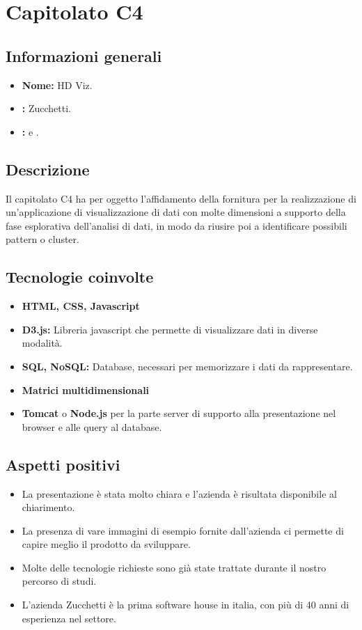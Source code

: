 \section{Capitolato C4}

\subsection{Informazioni generali}
\begin{itemize}
\item \textbf{Nome:} HD Viz.
\item \textbf{\commitProg:} Zucchetti.
\item \textbf{\proponProg:} \VT{} e \CR.
\end{itemize}

\subsection{Descrizione}
Il capitolato C4 ha per oggetto l’affidamento della fornitura per la realizzazione di un'applicazione di visualizzazione di dati con molte dimensioni a supporto della fase esplorativa dell'analisi di dati, in modo da riusire poi a identificare possibili pattern o cluster.

\subsection{Tecnologie coinvolte}
\begin{itemize}
\item \textbf{HTML, CSS, Javascript} 
\item \textbf{D3.js:} Libreria javascript che permette di visualizzare dati in diverse modalità.
\item \textbf{SQL, NoSQL:} Database, necessari per memorizzare i dati da rappresentare.
\item \textbf{Matrici multidimensionali}
\item \textbf{Tomcat} o \textbf{Node.js} per la parte server di supporto alla presentazione nel browser e alle query al database.
\end{itemize}

\subsection{Aspetti positivi}
\begin{itemize}
\item La presentazione è stata molto chiara e l’azienda è risultata disponibile al chiarimento.
\item La presenza di vare immagini di esempio fornite dall'azienda ci permette di capire meglio il prodotto da sviluppare.
\item Molte delle tecnologie richieste sono già state trattate durante il nostro percorso di studi.
\item L’azienda Zucchetti è la prima software house in italia, con più di 40 anni di esperienza nel settore.
\end{itemize}

